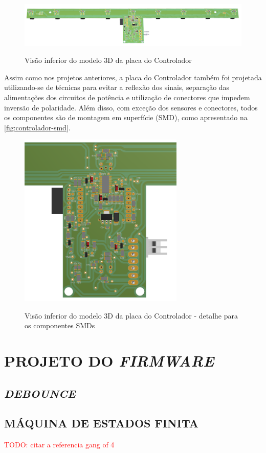 \begin{figure}[H]
    \centering
    \caption{Visão inferior do modelo 3D da placa do Controlador}
    \includegraphics[width=1.0\textwidth]{./dados/figuras/controlador-bottom}
    \label{fig:controlador-bottom}
\end{figure}

Assim como nos projetos anteriores, a placa do Controlador também foi projetada utilizando-se de técnicas para evitar a reflexão dos sinais, separação das alimentações dos circuitos de potência e utilização de conectores que impedem inversão de polaridade. Além disso, com exceção dos sensores e conectores, todos os componentes são de montagem em superfície (SMD), como apresentado na \autoref{fig:controlador-smd}.

\begin{figure}[H]
    \centering
    \caption{Visão inferior do modelo 3D da placa do Controlador - detalhe para os componentes SMDs}
    \includegraphics[width=0.7\textwidth]{./dados/figuras/controlador-smd}
    \label{fig:controlador-smd}
\end{figure}

\section{PROJETO DO \emph{FIRMWARE}}
\label{sec:firmware}

\subsection{\emph{DEBOUNCE}}
\label{subsec:debounce}

\subsection{MÁQUINA DE ESTADOS FINITA}
\label{subsec:fsm}

\textcolor{red}{TODO: citar a referencia gang  of 4}

